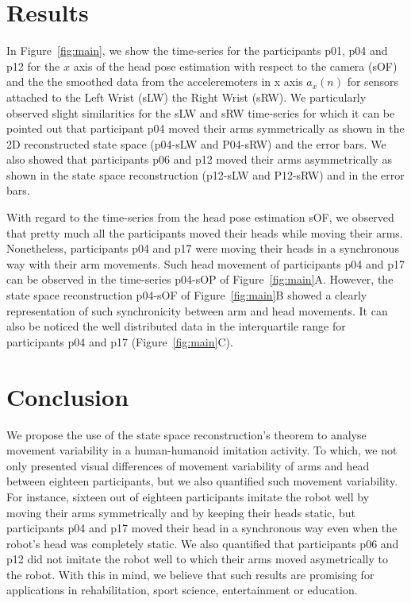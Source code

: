 \documentclass{sigchi}
\begin{document}
\section{Results}
In Figure~\ref{fig:main}, we show the time-series for the participants
p01, p04 and p12 for the $x$ axis of the head pose estimation with respect to the camera (sOF)
and the the smoothed data from the acceleremoters in x axis $a_x(n)$
for sensors attached to the Left Wrist (sLW) the Right Wrist (sRW).
We particularly observed slight similarities for the sLW and sRW time-series
for which it can be pointed out that participant p04 moved their arms symmetrically
as shown in the 2D reconstructed state space (p04-sLW and P04-sRW) and the error bars.
We also showed that participants p06 and p12 moved their arms asymmetrically as shown
in the state space reconstruction (p12-sLW and P12-sRW) and in the error bars.

With regard to the time-series from the head pose estimation sOF, we observed
that pretty much all the participants moved their heads while moving their arms.
Nonetheless, participants p04 and p17 were moving their heads in a synchronous way
with their arm movements. Such head movement of participants p04 and p17 can be
observed in the time-series p04-sOP of Figure~\ref{fig:main}A. However, the
state space reconstruction p04-sOF of Figure~\ref{fig:main}B showed a clearly
representation of such synchronicity between arm and head movements.
It can also be noticed the well distributed data in the interquartile range for
participants p04 and p17 (Figure~\ref{fig:main}C).
\section{Conclusion}
We propose the use of the state space reconstruction's theorem to analyse movement
variability in a human-humanoid imitation activity.
To which, we not only presented visual differences of movement variability
of arms and head between eighteen participants, but we also quantified such
movement variability.
For instance, sixteen out of eighteen participants imitate the robot well
by moving their arms symmetrically and by keeping their heads static, but
participants p04 and p17 moved their head in a synchronous way
even when the robot's head was completely static. We also quantified
that participants p06 and p12 did not imitate the robot well to which
their arms moved asymetrically to the robot. With this in mind, we believe
that such results are promising for applications in rehabilitation,
sport science, entertainment or education.
\end{document}
